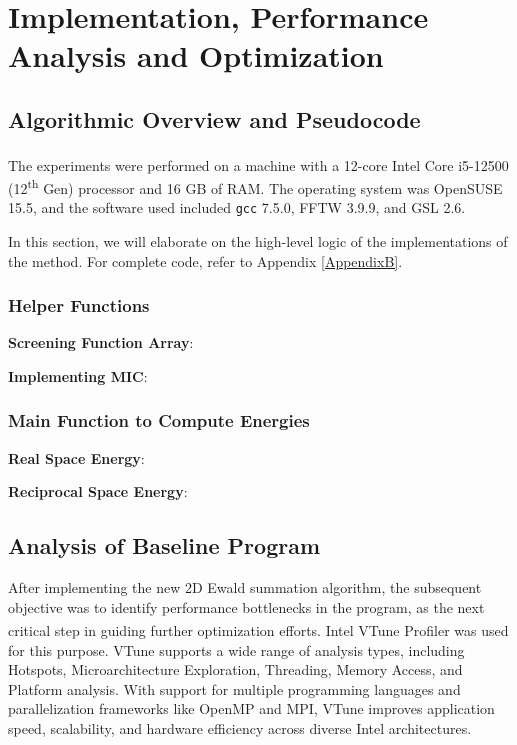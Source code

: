 \chapter{Implementation, Performance Analysis and Optimization}
\label{Chapter4}

\section{Algorithmic Overview and Pseudocode}


The experiments were performed on a machine with a 12-core Intel\textsuperscript{\textregistered} Core\texttrademark{} i5-12500 (12\textsuperscript{th} Gen) processor and 16 GB of RAM. The operating system was OpenSUSE 15.5, and the software used included \texttt{gcc} 7.5.0, FFTW 3.9.9, and GSL 2.6.

In this section, we will elaborate on the high-level logic of the implementations of the method. For complete code, refer to Appendix \ref{AppendixB}. 
\subsection{Helper Functions}
\textbf{Screening Function Array}:

\textbf{Implementing MIC}:

\subsection{Main Function to Compute Energies}
\textbf{Real Space Energy}:

\textbf{Reciprocal Space Energy}:

\section{Analysis of Baseline Program}
After implementing the new 2D Ewald summation algorithm, the subsequent objective was to identify performance bottlenecks in the program, as the next critical step in guiding further optimization efforts. Intel\textsuperscript{\textregistered} VTune\texttrademark{} Profiler was used for this purpose. VTune supports a wide range of analysis types, including Hotspots, Microarchitecture Exploration, Threading, Memory Access, and Platform analysis. With support for multiple programming languages and parallelization frameworks like OpenMP and MPI, VTune improves application speed, scalability, and hardware efficiency across diverse Intel architectures. 

